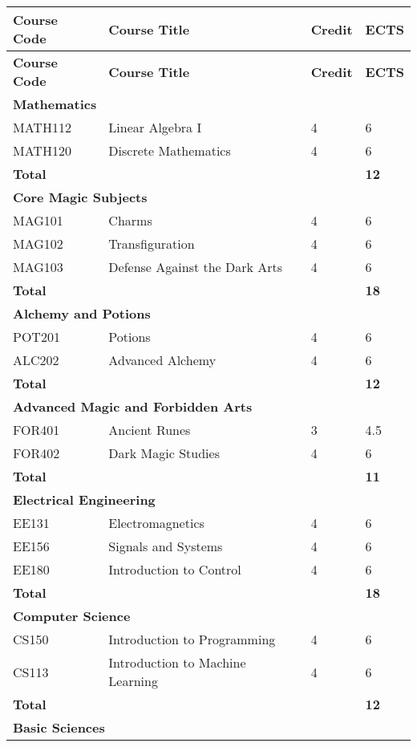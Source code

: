 \documentclass{report}
\begin{document}
\begin{longtable}{|p{3cm}|p{7.5cm}|p{1.5cm}|p{1.5cm}|}
\hline
\textbf{Course Code} & \textbf{Course Title} & \textbf{Credit} & \textbf{ECTS} \\ \hline
\endfirsthead %

\hline
\textbf{Course Code} & \textbf{Course Title} & \textbf{Credit} & \textbf{ECTS} \\ \hline
\endhead
\multicolumn{4}{l}{\textbf{Mathematics}} \\ \hline
MATH112 & Linear Algebra I & 4 & 6 \\ \hline
MATH120 & Discrete Mathematics & 4 & 6 \\ \hline
\textbf{Total} & & & \textbf{12}\\ \hline

\multicolumn{4}{|l|}{\textbf{Core Magic Subjects}} \\ \hline
MAG101 & Charms & 4 & 6 \\ \hline
MAG102 & Transfiguration & 4 & 6 \\ \hline
MAG103 & Defense Against the Dark Arts & 4 & 6 \\ \hline
\textbf{Total} & & & \textbf{18} \\ \hline

\multicolumn{4}{|l|}{\textbf{Alchemy and Potions}} \\ \hline
POT201 & Potions & 4 & 6 \\ \hline
ALC202 & Advanced Alchemy & 4 & 6 \\ \hline
\textbf{Total} & & & \textbf{12} \\ \hline

\multicolumn{4}{|l|}{\textbf{Advanced Magic and Forbidden Arts}} \\ \hline
FOR401 & Ancient Runes & 3 & 4.5 \\ \hline
FOR402 & Dark Magic Studies & 4 & 6 \\ \hline
\textbf{Total} & & & \textbf{11} \\ \hline

\multicolumn{4}{l}{\textbf{Electrical Engineering}} \\ \hline
EE131   & Electromagnetics & 4 & 6 \\ \hline
EE156   & Signals and Systems & 4 & 6 \\ \hline
EE180   & Introduction to Control & 4 & 6 \\ \hline
\textbf{Total} & & & \textbf{18}\\ \hline

\multicolumn{4}{l}{\textbf{Computer Science}} \\ \hline
CS150   & Introduction to Programming & 4 & 6 \\ \hline
CS113   & Introduction to Machine Learning & 4 & 6 \\ \hline
\textbf{Total} & & & \textbf{12}\\ \hline
\multicolumn{4}{l}{\textbf{Basic Sciences}} \\ \hline
\end{longtable}
\end{document}
